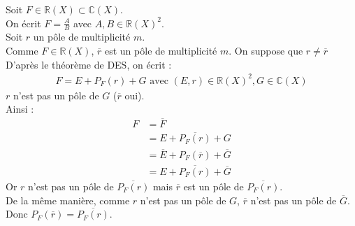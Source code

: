 \documentclass[../main.tex]{subfiles}
\begin{document}
\noindent Soit $F \in \mathbb{R}(X) \subset \mathbb{C}(X)$. \\
On écrit $F = \frac{A}{B}$ avec $A, B \in \mathbb{R}(X)^2$. \\
Soit $r$ un pôle de multiplicité $m$. \\
Comme $F \in \mathbb{R}(X)$, $\overline{r}$ est un pôle de multiplicité $m$. On suppose que $r \neq \overline{r}$ \\
D'après le théorème de DES, on écrit : 
\begin{align*}
    F = E + P_F(r) + G \text{ avec } (E, r) \in \mathbb{R}(X)^2, G \in \mathbb{C}(X)
\end{align*}
$r$ n'est pas un pôle de $G$ ($\overline{r}$ oui). \\
Ainsi : 
\begin{align*}
    F &= \overline{F} \\
    &= \overline{E + P_F(r) + G} \\
    &= \overline{E} + P_F(\overline{r}) + \overline{G} \\
    &= E + \overline{P_F(r)} + \overline{G}
\end{align*}
Or $r$ n'est pas un pôle de $\overline{P_F(r)}$ mais $\overline{r}$ est un pôle de $\overline{P_F(r)}$. \\
De la même manière, comme $r$ n'est pas un pôle de $G$, $\overline{r}$ n'est pas un pôle de $\overline{G}$. \\
Donc $P_F(\overline{r}) = \overline{P_F(r)}$.
\end{document}
